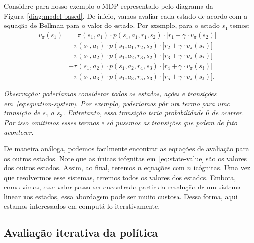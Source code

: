 \documentclass{article}
\begin{document}
            Considere para nosso exemplo o MDP representado pelo diagrama da Figura~\ref{diag:model-based}. De início, vamos avaliar cada estado de acordo com a equação de Bellman para o valor do estado. Por exemplo, para o estado $s_1$ temos:
            \begin{equation}
                \label{eq:equation-system}
                \begin{aligned}
                    v_\pi(s_1) 
                        &= \pi(s_1, a_1) \cdot p(s_1, a_1, r_1, s_2) \cdot \Big[ r_1 + \gamma \cdot v_\pi(s_2) \Big] \\
                        &+ \pi(s_1, a_1) \cdot p(s_1, a_1, r_2, s_2) \cdot \Big[ r_2 + \gamma \cdot v_\pi(s_2) \Big] \\
                        &+ \pi(s_1, a_2) \cdot p(s_1, a_2, r_3, s_2) \cdot \Big[ r_3 + \gamma \cdot v_\pi(s_2) \Big] \\
                        &+ \pi(s_1, a_2) \cdot p(s_1, a_2, r_4, s_3) \cdot \Big[ r_4 + \gamma \cdot v_\pi(s_3) \Big] \\
                        &+ \pi(s_1, a_3) \cdot p(s_1, a_3, r_5, s_3) \cdot \Big[ r_5 + \gamma \cdot v_\pi(s_3) \Big] .
                \end{aligned}
            \end{equation}
        
            \emph{Observação: poderíamos considerar todos os estados, ações e transições em~\eqref{eq:equation-system}. Por exemplo, poderíamos pôr um termo para uma transição de $s_1$ a $s_3$. Entretanto, essa transição teria probabilidade 0 de ocorrer. Por isso omitimos esses termos e só pusemos as transições que podem de fato acontecer.}
        
            De maneira análoga, podemos facilmente encontrar as equações de avaliação para os outros estados. Note que as únicas icógnitas em~\eqref{eq:state-value} são os valores dos outros estados. Assim, ao final, teremos $n$ equações com $n$ icógnitas. Uma vez que resolvermos esse sistemas, teremos todos os valores dos estados. Embora, como vimos, esse valor possa ser encontrado partir da resolução de um sistema linear nos estados, essa abordagem pode ser muito custosa. Dessa forma, aqui estamos interessados em computá-lo iterativamente. 
        
        \subsection{Avaliação iterativa da política}
        
\end{document}
